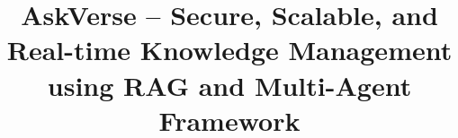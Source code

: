 \documentclass[default]{sn-jnl}%
\begin{document}
\title[AskVerse]{AskVerse – Secure, Scalable, and Real-time Knowledge Management using RAG and Multi-Agent Framework}


\author*[1]{ }


\end{document}
